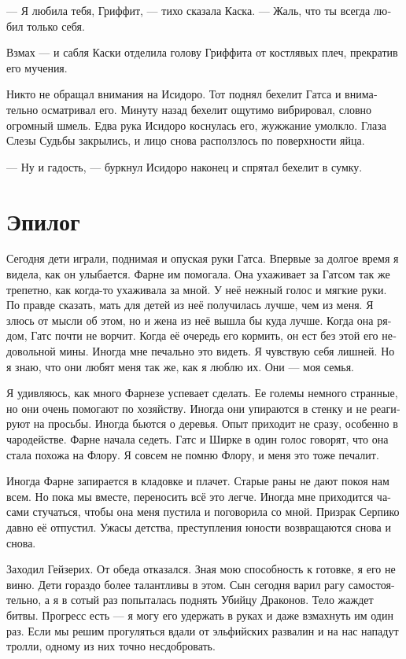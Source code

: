 \documentclass[a4paper,12pt,fleqn]{book}\usepackage{polyglossia}\setdefaultlanguage[babelshorthands=true]{russian}\setotherlanguage{english}\defaultfontfeatures{Ligatures=TeX,Mapping=tex-text}\usepackage{xcolor}\newcommand{\ml}[3]{#2}
\begin{document}
--- Я любила тебя, Гриффит, --- тихо сказала Каска.
--- Жаль, что ты всегда любил только себя.

Взмах --- и сабля Каски отделила голову Гриффита от костлявых плеч, прекратив его мучения.

Никто не обращал внимания на Исидоро.
Тот поднял бехелит Гатса и внимательно осматривал его.
Минуту назад бехелит ощутимо вибрировал, словно огромный шмель.
Едва рука Исидоро коснулась его, жужжание умолкло.
Глаза Слезы Судьбы закрылись, и лицо снова расползлось по поверхности яйца.

--- Ну и гадость, --- буркнул Исидоро наконец и спрятал бехелит в сумку.

\section{Эпилог}

Сегодня дети играли, поднимая и опуская руки Гатса.
Впервые за долгое время я видела, как он улыбается.
Фарне им помогала.
Она ухаживает за Гатсом так же трепетно, как когда-то ухаживала за мной.
У неё нежный голос и мягкие руки.
По правде сказать, мать для детей из неё получилась лучше, чем из меня.
Я злюсь от мысли об этом, но и жена из неё вышла бы куда лучше.
Когда она рядом, Гатс почти не ворчит.
Когда её очередь его кормить, он ест без этой его недовольной мины.
Иногда мне печально это видеть.
Я чувствую себя лишней.
Но я знаю, что они любят меня так же, как я люблю их.
Они --- моя семья.

Я удивляюсь, как много Фарнезе успевает сделать.
Ее големы немного странные, но они очень помогают по хозяйству.
Иногда они упираются в стенку и не реагируют на просьбы.
Иногда бьются о деревья.
Опыт приходит не сразу, особенно в чародействе.
Фарне начала седеть.
Гатс и Ширке в один голос говорят, что она стала похожа на Флору.
Я совсем не помню Флору, и меня это тоже печалит.

Иногда Фарне запирается в кладовке и плачет.
Старые раны не дают покоя нам всем.
Но пока мы вместе, переносить всё это легче.
Иногда мне приходится часами стучаться, чтобы она меня пустила и поговорила со мной.
Призрак Серпико давно её отпустил.
Ужасы детства, преступления юности возвращаются снова и снова.

Заходил Гейзерих.
От обеда отказался.
Зная мою способность к готовке, я его не виню.
Дети гораздо более талантливы в этом.
Сын сегодня варил рагу самостоятельно, а я в сотый раз попыталась поднять Убийцу Драконов.
Тело жаждет битвы.
Прогресс есть --- я могу его удержать в руках и даже взмахнуть им один раз.
Если мы решим прогуляться вдали от эльфийских развалин и на нас нападут тролли, одному из них точно несдобровать.
\end{document}
